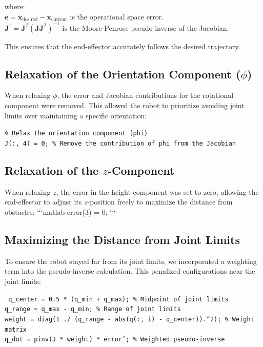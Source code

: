 \documentclass[12pt]{report}
\begin{document}
where:\\
 \(\mathbf{e} = \mathbf{x}_{\text{desired}} - \mathbf{x}_{\text{current}}\) is the operational space error.\\
 \(\mathbf{J}^\dagger = \mathbf{J}^T (\mathbf{J} \mathbf{J}^T)^{-1}\) is the Moore-Penrose pseudo-inverse of the Jacobian.

This ensures that the end-effector accurately follows the desired trajectory.
	\addtocounter{section}{6} 
\addtocounter{subsection}{0}
\subsection{Relaxation of the Orientation Component (\(\phi\))}
When relaxing \(\phi\), the error and Jacobian contributions for the rotational component were removed. This allowed the robot to prioritize avoiding joint limits over maintaining a specific orientation:

\begin{center}
	\texttt{\% Relax the orientation component (phi) \\
		J(:, 4) = 0; \% Remove the contribution of phi from the Jacobian}
\end{center}

\subsection{Relaxation of the \(z\)-Component}
When relaxing \(z\), the error in the height component was set to zero, allowing the end-effector to adjust its \(z\)-position freely to maximize the distance from obstacles:
```matlab
error(3) = 0; %
```

\subsection{Maximizing the Distance from Joint Limits}
To ensure the robot stayed far from its joint limits, we incorporated a weighting term into the pseudo-inverse calculation. This penalized configurations near the joint limits:

\begin{center}
	\texttt{
		q\_center = 0.5 * (q\_min + q\_max); \% Midpoint of joint limits \\
		q\_range = q\_max - q\_min; \% Range of joint limits \\
		weight = diag(1 ./ (q\_range - abs(q(:, i) - q\_center)).\^{}2); \% Weight matrix \\
		q\_dot = pinv(J * weight) * error'; \% Weighted pseudo-inverse
	}
\end{center}
\end{document}

